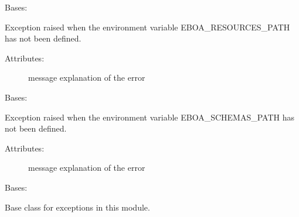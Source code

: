 
\begin{fulllineitems}
\label{\detokenize{eboa.engine:eboa.engine.errors.EboaResourcesPathNotAvailable}}
Bases: {\hyperref[\detokenize{eboa.engine:eboa.engine.errors.Error}]{}}

Exception raised when the environment variable EBOA\_RESOURCES\_PATH has not been defined.
\begin{description}
\item[{Attributes:}] \leavevmode
message \textendash{} explanation of the error

\end{description}

\end{fulllineitems}


\begin{fulllineitems}
\label{\detokenize{eboa.engine:eboa.engine.errors.EboaSchemasPathNotAvailable}}
Bases: {\hyperref[\detokenize{eboa.engine:eboa.engine.errors.Error}]{}}

Exception raised when the environment variable EBOA\_SCHEMAS\_PATH has not been defined.
\begin{description}
\item[{Attributes:}] \leavevmode
message \textendash{} explanation of the error

\end{description}

\end{fulllineitems}


\begin{fulllineitems}
\label{\detokenize{eboa.engine:eboa.engine.errors.Error}}
Bases: 

Base class for exceptions in this module.

\end{fulllineitems}

